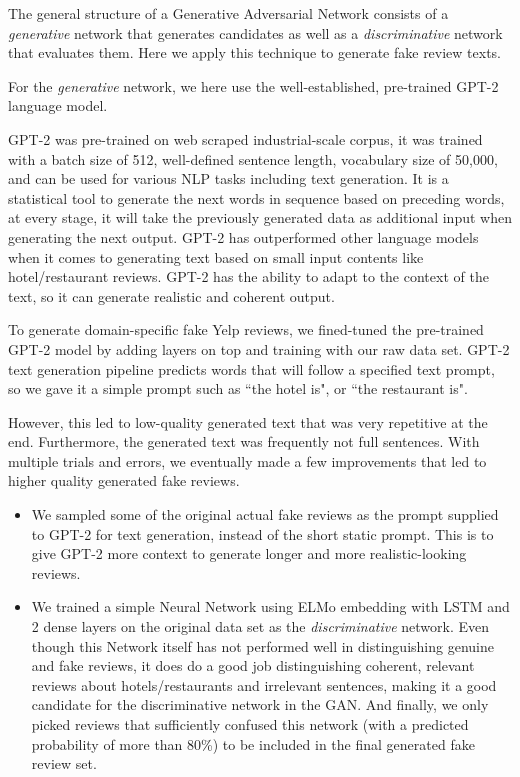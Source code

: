 \documentclass[conference, 11pt]{IEEEtran} %
\theoremstyle{plain}
\theoremstyle{definition}
\begin{document}
The general structure of a Generative Adversarial Network consists of a \textit{generative} network that generates candidates as well as a \textit{discriminative} network that evaluates them. Here we apply this technique to generate fake review texts.

For the \textit{generative} network, we here use the well-established, pre-trained GPT-2 language model.

GPT-2 was pre-trained on web scraped industrial-scale corpus, it was trained with a batch size of 512, well-defined sentence length, vocabulary size of 50,000, and can be used for various NLP tasks including text generation. It is a statistical tool to generate the next words in sequence based on preceding words, at every stage, it will take the previously generated data as additional input when generating the next output. GPT-2 has outperformed other language models when it comes to generating text based on small input contents like hotel/restaurant reviews. GPT-2 has the ability to adapt to the context of the text, so it can generate realistic and coherent output. 

To generate domain-specific fake Yelp reviews, we fined-tuned the pre-trained GPT-2 model by adding layers on top and training with our raw data set. GPT-2 text generation pipeline predicts words that will follow a specified text prompt, so we gave it a simple prompt such as ``the hotel is", or ``the restaurant is".

However, this led to low-quality generated text that was very repetitive at the end. Furthermore, the generated text was frequently not full sentences. With multiple trials and errors, we eventually made a few improvements that led to higher quality generated fake reviews.
\begin{itemize}
\item We sampled some of the original actual fake reviews as the prompt supplied to GPT-2 for text generation, instead of the short static prompt. This is to give GPT-2 more context to generate longer and more realistic-looking reviews.

\item We trained a simple Neural Network using ELMo embedding with LSTM and 2 dense layers on the original data set as the \textit{discriminative} network. Even though this Network itself has not performed well in distinguishing genuine and fake reviews, it does do a good job distinguishing coherent, relevant reviews about hotels/restaurants and irrelevant sentences, making it a good candidate for the discriminative network in the GAN. And finally, we only picked reviews that sufficiently confused this network (with a predicted probability of more than 80\%) to be included in the final generated fake review set.
\end{itemize}
\end{document}
